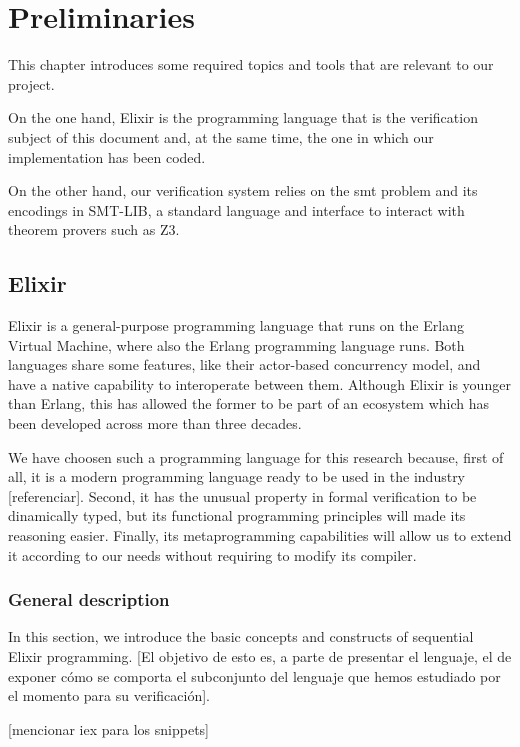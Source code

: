 \chapter{Preliminaries}
\label{cap:preliminaries}

This chapter introduces some required topics and tools that are relevant to
our project. 

On the one hand, Elixir is the programming language that is the verification 
subject of this document and, at the same time, the one in which our 
implementation has been coded. 

On the other hand, our verification system relies on the \gls{smt} problem and
its encodings in SMT-LIB, a standard language and interface to interact with 
theorem provers such as Z3.

\section{Elixir}

Elixir is a general-purpose programming language that runs on the Erlang
Virtual Machine, where also the Erlang programming language runs. Both
languages share some features, like their actor-based concurrency model, and
have a native capability to interoperate between them. Although Elixir is
younger than Erlang, this has allowed the former to be part of an ecosystem
which has been developed across more than three decades.

We have choosen such a programming language for this research because,
first of all, it is a modern programming language ready to be used in the
industry [referenciar]. Second, it has the unusual property in formal 
verification to be dinamically typed, but its functional programming principles
will made its reasoning easier. Finally, its metaprogramming capabilities will
allow us to extend it according to our needs without requiring to modify its 
compiler.

\subsection{General description}

In this section, we introduce the basic concepts and constructs of sequential
Elixir programming. [El objetivo de esto es, a parte de presentar el lenguaje,
el de exponer cómo se comporta el subconjunto del lenguaje que hemos estudiado
por el momento para su verificación].

[mencionar iex para los snippets]

